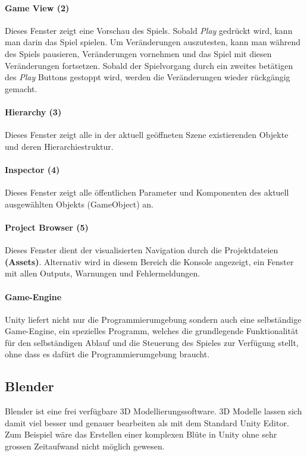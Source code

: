\paragraph{Game View (2)}
Dieses Fenster zeigt eine Vorschau des Spiels.
Sobald \textit{Play} gedrückt wird, kann man darin das Spiel spielen.
Um Veränderungen auszutesten, kann man während des Spiels pausieren, Veränderungen vornehmen und das Spiel mit diesen Veränderungen fortsetzen. Sobald der Spielvorgang durch ein zweites betätigen des \textit{Play} Buttons gestoppt wird, werden die Veränderungen wieder rückgängig gemacht.

\paragraph{Hierarchy (3)}
Dieses Fenster zeigt alle in der aktuell geöffneten Szene existierenden Objekte und deren Hierarchiestruktur.

\paragraph{Inspector (4)}
Dieses Fenster zeigt alle öffentlichen Parameter und Komponenten des aktuell ausgewählten Objekts (GameObject) an.

\paragraph{Project Browser (5)}
Dieses Fenster dient der visualisierten Navigation durch die Projektdateien \textbf{(Assets)}.
Alternativ wird in diesem Bereich die Konsole angezeigt, ein Fenster mit allen Outputs, Warnungen und Fehlermeldungen.

\paragraph{Game-Engine}
Unity liefert nicht nur die Programmierumgebung sondern auch eine selbständige Game-Engine, ein spezielles Programm, welches die grundlegende Funktionalität für den selbständigen Ablauf und die Steuerung des Spieles zur Verfügung stellt, ohne dass es dafürt die Programmierumgebung braucht.


\subsection{Blender}
Blender ist eine frei verfügbare 3D Modellierungssoftware.
3D Modelle lassen sich damit viel besser und genauer bearbeiten als mit dem Standard Unity Editor. 
Zum Beispiel wäre das Erstellen einer komplexen Blüte in Unity ohne sehr grossen Zeitaufwand nicht möglich gewesen.

